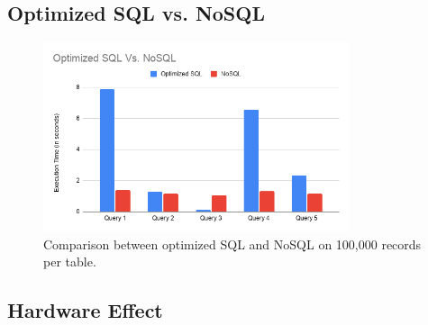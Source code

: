 \subsection{Optimized SQL vs. NoSQL}
\begin{figure}[H]
    \centering
    \includegraphics[width=0.8\textwidth]{images/stats/sql-vs-nosql.png}
    \caption{Comparison between optimized SQL and NoSQL on 100,000 records per table.}
    \label{fig:db-size-2}
\end{figure}

\subsection{Hardware Effect}
